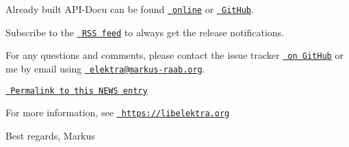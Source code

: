 Already built A\+P\+I-\/\+Docu can be found \href{https://doc.libelektra.org/api/0.8.20/html/}{\texttt{ online}} or \href{https://github.com/ElektraInitiative/doc/tree/master/api/0.8.20}{\texttt{ Git\+Hub}}.

Subscribe to the \href{https://www.libelektra.org/news/feed.rss}{\texttt{ R\+SS feed}} to always get the release notifications.

For any questions and comments, please contact the issue tracker \href{http://issues.libelektra.org}{\texttt{ on Git\+Hub}} or me by email using \href{mailto:elektra@markus-raab.org}{\texttt{ elektra@markus-\/raab.\+org}}.

\href{https://www.libelektra.org/news/0.8.20-release}{\texttt{ Permalink to this N\+E\+WS entry}}

For more information, see \href{https://libelektra.org}{\texttt{ https\+://libelektra.\+org}}

Best regards, Markus 
